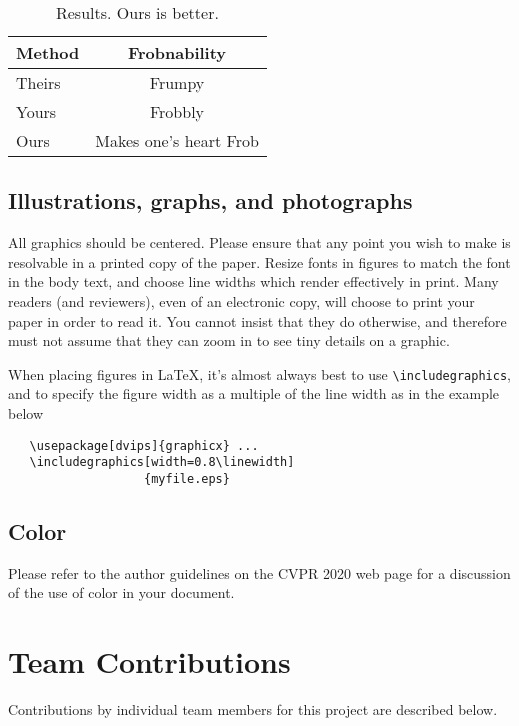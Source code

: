 \documentclass[10pt,twocolumn,letterpaper]{article}
\begin{document}
\begin{table}
\begin{center}
\begin{tabular}{|l|c|}
\hline
Method & Frobnability \\
\hline\hline
Theirs & Frumpy \\
Yours & Frobbly \\
Ours & Makes one's heart Frob\\
\hline
\end{tabular}
\end{center}
\caption{Results.   Ours is better.}
\end{table}

\subsection{Illustrations, graphs, and photographs}

All graphics should be centered.  Please ensure that any point you wish to
make is resolvable in a printed copy of the paper.  Resize fonts in figures
to match the font in the body text, and choose line widths which render
effectively in print.  Many readers (and reviewers), even of an electronic
copy, will choose to print your paper in order to read it.  You cannot
insist that they do otherwise, and therefore must not assume that they can
zoom in to see tiny details on a graphic.

When placing figures in \LaTeX, it's almost always best to use
\verb+\includegraphics+, and to specify the  figure width as a multiple of
the line width as in the example below
{\small\begin{verbatim}
   \usepackage[dvips]{graphicx} ...
   \includegraphics[width=0.8\linewidth]
                   {myfile.eps}
\end{verbatim}
}


\subsection{Color}

Please refer to the author guidelines on the CVPR 2020 web page for a discussion
of the use of color in your document.


\section{Team Contributions}
Contributions by individual team members for this project are described below. 
\end{document}
